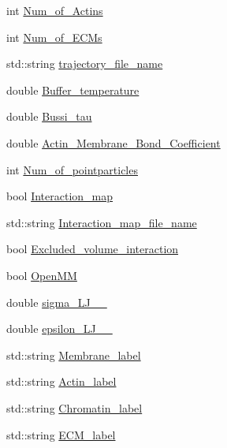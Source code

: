\begin{DoxyCompactItemize}
\item 
int \mbox{\hyperlink{namespaceGenConst_a74cb3c07acb344ebdeeb885fbdacd13a}{Num\+\_\+of\+\_\+\+Actins}}
\item 
int \mbox{\hyperlink{namespaceGenConst_a70039a764f7a8ef1084d977559fd5c3b}{Num\+\_\+of\+\_\+\+E\+C\+Ms}}
\item 
std\+::string \mbox{\hyperlink{namespaceGenConst_aadb6de9465987552f3367a893c9f0817}{trajectory\+\_\+file\+\_\+name}}
\item 
double \mbox{\hyperlink{namespaceGenConst_a9deb819215b4b909972f699931e4e155}{Buffer\+\_\+temperature}}
\item 
double \mbox{\hyperlink{namespaceGenConst_aad6835547fc7bc7ef3069986f08e2792}{Bussi\+\_\+tau}}
\item 
double \mbox{\hyperlink{namespaceGenConst_a605feaf5d31899243b6222624163cf29}{Actin\+\_\+\+Membrane\+\_\+\+Bond\+\_\+\+Coefficient}}
\item 
int \mbox{\hyperlink{namespaceGenConst_aec456997dd27bb5eb5c636fbc78f39fc}{Num\+\_\+of\+\_\+pointparticles}}
\item 
bool \mbox{\hyperlink{namespaceGenConst_ad847e6f5e498c18806f453d643ee8b1e}{Interaction\+\_\+map}}
\item 
std\+::string \mbox{\hyperlink{namespaceGenConst_a99a2fa8732b65ec4de1dfaca040a11de}{Interaction\+\_\+map\+\_\+file\+\_\+name}}
\item 
bool \mbox{\hyperlink{namespaceGenConst_a2a8e8f88c2959679b92fc79c94d07ad9}{Excluded\+\_\+volume\+\_\+interaction}}
\item 
bool \mbox{\hyperlink{namespaceGenConst_abcb46238d30411769a54de2a308a9717}{Open\+MM}}
\item 
double \mbox{\hyperlink{namespaceGenConst_a34375d0ec9af3672f5fcbe624044ad8d}{sigma\+\_\+\+L\+J\+\_\+\_}}
\item 
double \mbox{\hyperlink{namespaceGenConst_aed07d4c4a7f92cd150a09f87bdb65b70}{epsilon\+\_\+\+L\+J\+\_\+\_}}
\item 
std\+::string \mbox{\hyperlink{namespaceGenConst_acefa162cfa7572ce261245beaa812c9b}{Membrane\+\_\+label}}
\item 
std\+::string \mbox{\hyperlink{namespaceGenConst_a9acdda43f7e8ee196130df7f5966e658}{Actin\+\_\+label}}
\item 
std\+::string \mbox{\hyperlink{namespaceGenConst_a2614662d6f315ee0639468cb7a42ee0c}{Chromatin\+\_\+label}}
\item 
std\+::string \mbox{\hyperlink{namespaceGenConst_a8a4424d53bb365766d5396d7b03df41e}{E\+C\+M\+\_\+label}}
\end{DoxyCompactItemize}


